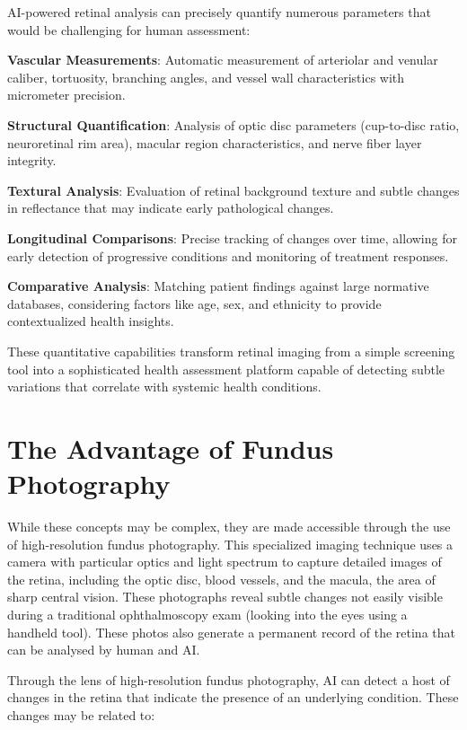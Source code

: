\documentclass[
  Letterpaper,
]{scrbook}
\begin{document}
AI-powered retinal analysis can precisely quantify numerous parameters
that would be challenging for human assessment:

\textbf{Vascular Measurements}: Automatic measurement of arteriolar and
venular caliber, tortuosity, branching angles, and vessel wall
characteristics with micrometer precision.

\textbf{Structural Quantification}: Analysis of optic disc parameters
(cup-to-disc ratio, neuroretinal rim area), macular region
characteristics, and nerve fiber layer integrity.

\textbf{Textural Analysis}: Evaluation of retinal background texture and
subtle changes in reflectance that may indicate early pathological
changes.

\textbf{Longitudinal Comparisons}: Precise tracking of changes over
time, allowing for early detection of progressive conditions and
monitoring of treatment responses.

\textbf{Comparative Analysis}: Matching patient findings against large
normative databases, considering factors like age, sex, and ethnicity to
provide contextualized health insights.

These quantitative capabilities transform retinal imaging from a simple
screening tool into a sophisticated health assessment platform capable
of detecting subtle variations that correlate with systemic health
conditions.

\section{The Advantage of Fundus
Photography}\label{the-advantage-of-fundus-photography}

While these concepts may be complex, they are made accessible through
the use of high-resolution fundus photography. This specialized imaging
technique uses a camera with particular optics and light spectrum to
capture detailed images of the retina, including the optic disc, blood
vessels, and the macula, the area of sharp central vision. These
photographs reveal subtle changes not easily visible during a
traditional ophthalmoscopy exam (looking into the eyes using a handheld
tool). These photos also generate a permanent record of the retina that
can be analysed by human and AI.

Through the lens of high-resolution fundus photography, AI can detect a
host of changes in the retina that indicate the presence of an
underlying condition. These changes may be related to:
\end{document}
